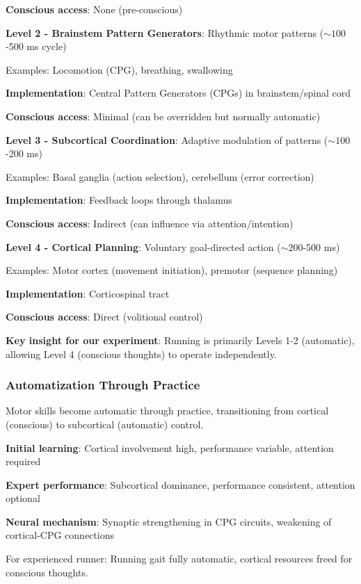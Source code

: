 \documentclass[11pt,onecolumn]{article}
\begin{document}
\textbf{Conscious access}: None (pre-conscious)

\textbf{Level 2 - Brainstem Pattern Generators}: Rhythmic motor patterns ($\sim 100$-500 ms cycle)

Examples: Locomotion (CPG), breathing, swallowing

\textbf{Implementation}: Central Pattern Generators (CPGs) in brainstem/spinal cord

\textbf{Conscious access}: Minimal (can be overridden but normally automatic)

\textbf{Level 3 - Subcortical Coordination}: Adaptive modulation of patterns ($\sim 100$-200 ms)

Examples: Basal ganglia (action selection), cerebellum (error correction)

\textbf{Implementation}: Feedback loops through thalamus

\textbf{Conscious access}: Indirect (can influence via attention/intention)

\textbf{Level 4 - Cortical Planning}: Voluntary goal-directed action ($\sim 200$-500 ms)

Examples: Motor cortex (movement initiation), premotor (sequence planning)

\textbf{Implementation}: Corticospinal tract

\textbf{Conscious access}: Direct (volitional control)

\textbf{Key insight for our experiment}: Running is primarily Levels 1-2 (automatic), allowing Level 4 (conscious thoughts) to operate independently.

\subsubsection{Automatization Through Practice}

Motor skills become automatic through practice, transitioning from cortical (conscious) to subcortical (automatic) control.

\textbf{Initial learning}: Cortical involvement high, performance variable, attention required

\textbf{Expert performance}: Subcortical dominance, performance consistent, attention optional

\textbf{Neural mechanism}: Synaptic strengthening in CPG circuits, weakening of cortical-CPG connections

For experienced runner: Running gait fully automatic, cortical resources freed for conscious thoughts.
\end{document}

